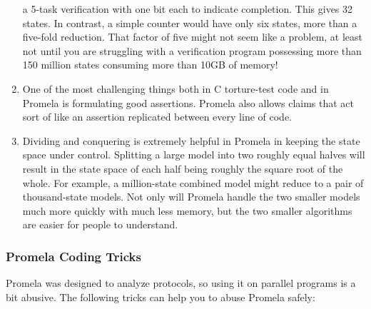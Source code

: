 \begin{enumerate}
	a 5-task verification with one bit each to indicate completion.
	This gives 32 states.  In contrast, a simple counter would have
	only six states, more than a five-fold reduction.  That factor
	of five might not seem like a problem, at least not until you
	are struggling with a verification program possessing more than
	150 million states consuming more than 10GB of memory!
\item	One of the most challenging things both in C torture-test code and
	in Promela is formulating good assertions.  Promela also allows
	 claims that act sort of like an assertion replicated
	between every line of code.
\item	Dividing and conquering is extremely helpful in Promela in keeping
	the state space under control.  Splitting a large model into two
	roughly equal halves will result in the state space of each
	half being roughly the square root of the whole.
	For example, a million-state combined model might reduce to a
	pair of thousand-state models.
	Not only will Promela handle the two smaller models much more
	quickly with much less memory, but the two smaller algorithms
	are easier for people to understand.
\end{enumerate}


\subsubsection{Promela Coding Tricks}
\label{sec:formal:Promela Coding Tricks}

Promela was designed to analyze protocols, so using it on parallel programs
is a bit abusive.
The following tricks can help you to abuse Promela safely:

